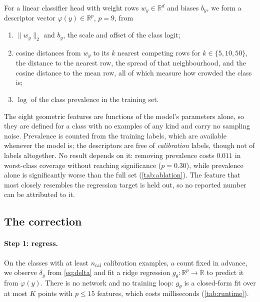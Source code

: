 For a linear classifier head with weight rows $w_y\in\mathbb{R}^d$ and biases $b_y$, we form a
descriptor vector $\varphi(y)\in\mathbb{R}^{p}$, $p=9$, from
\begin{enumerate}[itemsep=1pt,topsep=2pt,leftmargin=*]
\item $\|w_y\|_2$ and $b_y$, the scale and offset of the class logit;
\item cosine distances from $w_y$ to its $k$ nearest competing rows for
      $k\in\{5,10,50\}$, the distance to the nearest row, the spread of that
      neighbourhood, and the cosine distance to the mean row, all of which measure how
      crowded the class is;
\item $\log$ of the class prevalence in the training set.
\end{enumerate}
The eight geometric features are functions of the model's parameters alone, so they are
defined for a class with no examples of any kind and carry no sampling noise. Prevalence is
counted from the training labels, which are available whenever the model is; the descriptors
are free of \emph{calibration} labels, though not of labels altogether. No result depends
on it: removing prevalence costs $0.011$ in worst-class coverage without reaching significance
($p=0.30$), while prevalence alone is significantly worse than the full set
(\cref{tab:ablation}). The
feature that most closely resembles the regression target is held out, so no reported number
can be attributed to it.

\subsection{The correction}
\label{sec:correction}

\paragraph{Step 1: regress.} On the classes with at least $n_{\mathrm{cal}}$ calibration
examples, a count fixed in advance, we observe $\delta_y$ from
\cref{eq:delta} and fit a ridge regression $g_\theta:\mathbb{R}^p\to\mathbb{R}$ to predict it
from $\varphi(y)$. There is no network and no training loop: $g_\theta$ is a closed-form fit
over at most $K$ points with $p\le 15$ features, which costs milliseconds
(\cref{tab:runtime}).

